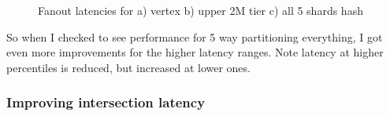 \documentclass[11pt]{article}
\begin{document}
\begin{figure}
\begin{center}
  \end{center}
  \label{fig:fanout}
  \caption{Fanout latencies for a) vertex b) upper 2M tier c) all 5 shards hash}
\end{figure}

So when I checked to see performance for 5 way partitioning everything, I got even more improvements for the higher latency ranges. Note latency at higher percentiles is reduced, but increased at lower ones. 

\subsubsection{Improving intersection latency}
\end{document}
